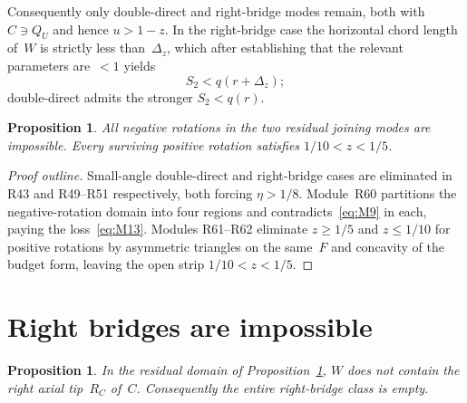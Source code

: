 \documentclass[11pt,reqno]{amsart}
\newtheorem{proposition}[theorem]{Proposition}
\theoremstyle{definition}
\begin{document}
Consequently only double-direct and right-bridge modes remain, both with
$C\ni Q_U$ and hence $u>1-z$.  In the right-bridge case the horizontal chord
length of~$W$ is strictly less than~$\Delta_z$, which after establishing that
the relevant parameters are~$<1$ yields
\begin{equation}\label{eq:M13}
S_2<q(r+\Delta_z);
\end{equation}
double-direct admits the stronger $S_2<q(r)$.

\begin{proposition}\label{prop:M92}
All negative rotations in the two residual joining modes are impossible.
Every surviving positive rotation satisfies $1/10<z<1/5$.
\end{proposition}

\begin{proof}[Proof outline]
Small-angle double-direct and right-bridge cases are eliminated in R43 and
R49--R51 respectively, both forcing $\eta>1/8$.  Module~R60 partitions the
negative-rotation domain into four regions and contradicts~\eqref{eq:M9} in
each, paying the loss~\eqref{eq:M13}.  Modules R61--R62 eliminate
$z\ge 1/5$ and $z\le 1/10$ for positive rotations by asymmetric triangles on
the same~$F$ and concavity of the budget form, leaving the open strip
$1/10<z<1/5$.
\end{proof}

\section{Right bridges are impossible}\label{sec:M10}

\begin{proposition}\label{prop:M101}
In the residual domain of Proposition~\ref{prop:M92}, $W$ does not contain the
right axial tip~$R_C$ of~$C$.  Consequently the entire right-bridge class is
empty.
\end{proposition}
\end{document}
